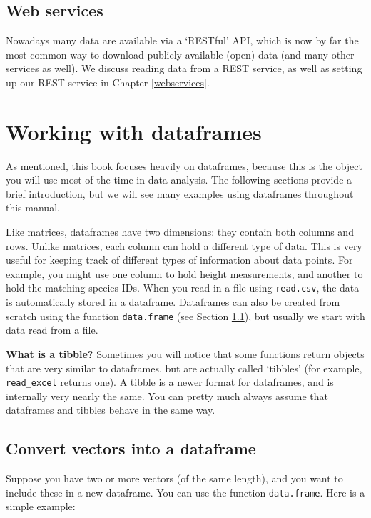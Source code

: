 \documentclass[]{book}
\let\BeginKnitrBlock\begin \let\EndKnitrBlock\end
\begin{document}
\hypertarget{web-services}{%
\subsection{Web services}\label{web-services}}

Nowadays many data are available via a `RESTful' API, which is now by far the most common way to download publicly available (open) data (and many other services as well). We discuss reading data from a REST service, as well as setting up our REST service in Chapter \ref{webservices}.

\hypertarget{dataframes}{%
\section{Working with dataframes}\label{dataframes}}

As mentioned, this book focuses heavily on dataframes, because this is the object you will use most of the time in data analysis. The following sections provide a brief introduction, but we will see many examples using dataframes throughout this manual.

Like matrices, dataframes have two dimensions: they contain both columns and rows. Unlike matrices, each column can hold a different type of data. This is very useful for keeping track of different types of information about data points. For example, you might use one column to hold height measurements, and another to hold the matching species IDs. When you read in a file using \texttt{read.csv}, the data is automatically stored in a dataframe. Dataframes can also be created from scratch using the function \texttt{data.frame} (see Section \ref{vecstodfr}), but usually we start with data read from a file.

\BeginKnitrBlock{rmdinfo}
\textbf{What is a tibble?}
Sometimes you will notice that some functions return objects that are very similar to
dataframes, but are actually called `tibbles' (for example, \texttt{read\_excel} returns one). A tibble is a newer format for dataframes, and is internally very nearly the same. You can pretty much always assume that dataframes and tibbles behave in the same way.
\EndKnitrBlock{rmdinfo}

\hypertarget{vecstodfr}{%
\subsection{Convert vectors into a dataframe}\label{vecstodfr}}

Suppose you have two or more vectors (of the same length), and you want to include these in a new dataframe. You can use the function \texttt{data.frame}. Here is a simple example:
\end{document}
